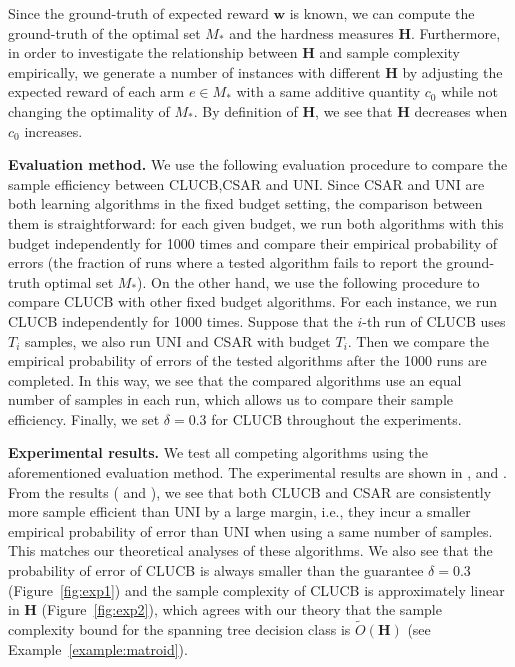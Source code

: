 \documentclass{article}
\newcommand{\Algorithm}{{\small \textsf{CLUCB}}\xspace}
\newcommand{\AlgorithmBud}{{\small \textsf{CSAR}}\xspace}
\newcommand{\Uniform}{{\small \textsf{UNI}}\xspace}
\renewcommand{\vec}[1]{\boldsymbol{#1}}
\begin{document}
Since the ground-truth of expected reward $\vec w$ is known, we can compute the ground-truth of the optimal set $M_*$ and the hardness measures $\mathbf H$.
Furthermore, in order to investigate the relationship between $\mathbf H$ and sample complexity empirically, we generate a number of instances with different $\mathbf H$ by adjusting the expected reward of each arm $e\in M_*$ with a same additive quantity $c_0$ while not changing the optimality of $M_*$.
By definition of $\mathbf H$, we see that $\mathbf H$ decreases when $c_0$ increases.


\textbf{Evaluation method.} 
We use the following evaluation procedure to compare the sample efficiency between \Algorithm,\AlgorithmBud and \Uniform.
Since \AlgorithmBud and \Uniform are both learning algorithms in the fixed budget setting, the comparison between them is straightforward:
for each given budget, we run both algorithms with this budget independently for 1000 times and compare their empirical probability of errors (the fraction of runs where a tested algorithm fails to report the ground-truth optimal set $M_*$).
On the other hand, we use the following procedure to compare \Algorithm with other fixed budget algorithms.
For each instance, we run \Algorithm independently for 1000 times.
Suppose that the $i$-th run of \Algorithm uses $T_i$ samples, we also run \Uniform and \AlgorithmBud with budget $T_i$.
Then we compare the empirical probability of errors of the tested algorithms after the 1000 runs are completed.
In this way, we see that the compared algorithms use an equal number of samples in each run, which allows us to compare their sample efficiency.
Finally, we set $\delta=0.3$ for \Algorithm throughout the experiments.




\textbf{Experimental results.}
We test all competing algorithms using the aforementioned evaluation method.
The experimental results are shown in ,  and .
From the results ( and ), we see that both \Algorithm and \AlgorithmBud are consistently more sample efficient than \Uniform by a large margin, i.e., they incur a smaller empirical probability of error than \Uniform when using a same number of samples.
This matches our theoretical analyses of these algorithms.
We also see that the probability of error of \Algorithm is always smaller than the guarantee $\delta=0.3$ (Figure~\ref{fig:exp1}) and the sample complexity of \Algorithm is approximately linear in $\mathbf H$ (Figure~\ref{fig:exp2}), which agrees with our theory that the sample complexity bound for the spanning tree decision class is $\tilde O(\mathbf H)$ (see Example~\ref{example:matroid}).
\end{document}
